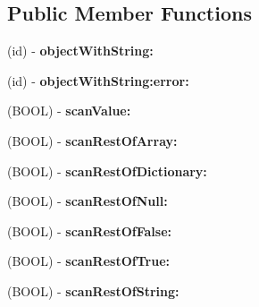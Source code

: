 \subsection*{Public Member Functions}
\begin{DoxyCompactItemize}
\item 
\hypertarget{interface_s_b_json_parser_a1ec40b986576044d58d30172b141c74c}{
(id) -\/ {\bfseries objectWithString:}}
\label{interface_s_b_json_parser_a1ec40b986576044d58d30172b141c74c}

\item 
\hypertarget{interface_s_b_json_parser_a7a7fff47f41a08fa0defc4f628846e15}{
(id) -\/ {\bfseries objectWithString:error:}}
\label{interface_s_b_json_parser_a7a7fff47f41a08fa0defc4f628846e15}

\item 
\hypertarget{interface_s_b_json_parser_ac636e0452108eb160cef77b66e912b0a}{
(BOOL) -\/ {\bfseries scanValue:}}
\label{interface_s_b_json_parser_ac636e0452108eb160cef77b66e912b0a}

\item 
\hypertarget{interface_s_b_json_parser_a081c4ee408752efed7e907d9f9c2d4ca}{
(BOOL) -\/ {\bfseries scanRestOfArray:}}
\label{interface_s_b_json_parser_a081c4ee408752efed7e907d9f9c2d4ca}

\item 
\hypertarget{interface_s_b_json_parser_a3de09621653a0a1cd940f227d043bacb}{
(BOOL) -\/ {\bfseries scanRestOfDictionary:}}
\label{interface_s_b_json_parser_a3de09621653a0a1cd940f227d043bacb}

\item 
\hypertarget{interface_s_b_json_parser_aeea34f47e63b11e406fa6a7b96108190}{
(BOOL) -\/ {\bfseries scanRestOfNull:}}
\label{interface_s_b_json_parser_aeea34f47e63b11e406fa6a7b96108190}

\item 
\hypertarget{interface_s_b_json_parser_a9b7107e91b570bcb02fb42d1003ead3b}{
(BOOL) -\/ {\bfseries scanRestOfFalse:}}
\label{interface_s_b_json_parser_a9b7107e91b570bcb02fb42d1003ead3b}

\item 
\hypertarget{interface_s_b_json_parser_a246c0a820e6fd69db1bbe79167c578c6}{
(BOOL) -\/ {\bfseries scanRestOfTrue:}}
\label{interface_s_b_json_parser_a246c0a820e6fd69db1bbe79167c578c6}

\item 
\hypertarget{interface_s_b_json_parser_a0b251c81dc2753e3330709af36112429}{
(BOOL) -\/ {\bfseries scanRestOfString:}}
\label{interface_s_b_json_parser_a0b251c81dc2753e3330709af36112429}


\end{DoxyCompactItemize}
